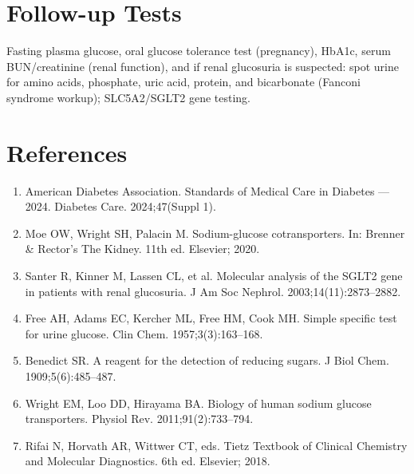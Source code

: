 \section*{Follow-up Tests}
Fasting plasma glucose, oral glucose tolerance test (pregnancy), HbA1c, serum BUN/creatinine (renal function), and if renal glucosuria is suspected: spot urine for amino acids, phosphate, uric acid, protein, and bicarbonate (Fanconi syndrome workup); SLC5A2/SGLT2 gene testing.
\section*{References}
\begin{enumerate}
  \item American Diabetes Association. Standards of Medical Care in Diabetes --- 2024. Diabetes Care. 2024;47(Suppl 1).
  \item Moe OW, Wright SH, Palacin M. Sodium-glucose cotransporters. In: Brenner \& Rector's The Kidney. 11th ed. Elsevier; 2020.
  \item Santer R, Kinner M, Lassen CL, et al. Molecular analysis of the SGLT2 gene in patients with renal glucosuria. J Am Soc Nephrol. 2003;14(11):2873--2882.
  \item Free AH, Adams EC, Kercher ML, Free HM, Cook MH. Simple specific test for urine glucose. Clin Chem. 1957;3(3):163--168.
  \item Benedict SR. A reagent for the detection of reducing sugars. J Biol Chem. 1909;5(6):485--487.
  \item Wright EM, Loo DD, Hirayama BA. Biology of human sodium glucose transporters. Physiol Rev. 2011;91(2):733--794.
  \item Rifai N, Horvath AR, Wittwer CT, eds. Tietz Textbook of Clinical Chemistry and Molecular Diagnostics. 6th ed. Elsevier; 2018.
\end{enumerate}
\clearpage
